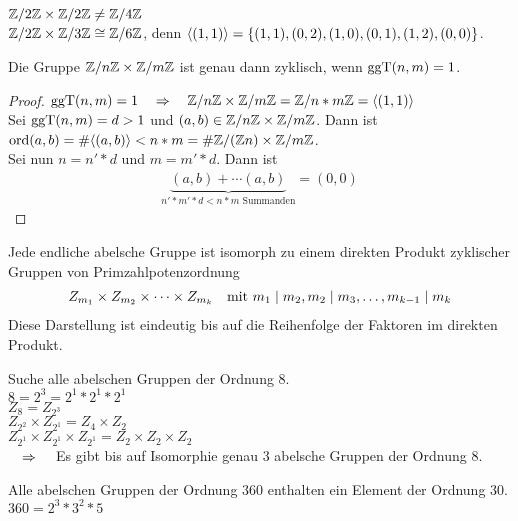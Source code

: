 \begin{bsp}
	$\mathbb{Z} / 2 \mathbb{Z} \times \mathbb{Z} / 2 \mathbb{Z} \neq \mathbb{Z} / 4 \mathbb{Z}$ \\
	$\mathbb{Z} / 2 \mathbb{Z} \times \mathbb{Z} / 3 \mathbb{Z} \cong \mathbb{Z} / 6 \mathbb{Z}$, denn $\langle (1,1) \rangle = \{ (1,1) , (0,2) , (1,0) , (0,1) ,(1,2) , (0,0) \}$.
\end{bsp}

\begin{satz}
	Die Gruppe $\mathbb{Z} / n \mathbb{Z} \times \mathbb{Z} / m \mathbb{Z}$ ist genau dann zyklisch, wenn $\operatorname{ggT}(n,m) = 1$.
\end{satz}
\begin{proof}
	$\operatorname{ggT}(n,m)=1 \quad \Rightarrow \quad \mathbb{Z} / n \mathbb{Z} \times \mathbb{Z} / m \mathbb{Z} = \mathbb{Z} / n*m \mathbb{Z} = \langle (1,1) \rangle$ \\
	Sei $\operatorname{ggT}(n,m) = d > 1$ und $(a,b) \in \mathbb{Z} / n \mathbb{Z} \times \mathbb{Z} / m \mathbb{Z}$. Dann ist $\operatorname{ord}(a,b) = \# \langle (a,b) \rangle < n*m = \# \mathbb{Z} / ( \mathbb{Z} n) \times \mathbb{Z} / m \mathbb{Z}$. \\
	Sei nun $n=n' * d$ und $m=m' * d$. Dann ist
	\begin{align*}
	\underbrace{(a,b) + \cdots (a,b)}_{n'*m'*d < n*m \text{ Summanden}} = (0,0)
	\end{align*}
\end{proof}

\begin{thm}
	Jede endliche abelsche Gruppe ist isomorph zu einem direkten Produkt zyklischer Gruppen von Primzahlpotenzordnung
	\begin{align*}
	Z_{m_1} \times Z_{m_2} \times \cdots \times Z_{m_k} \quad \text{mit } m_1 \mid m_2, m_2 \mid m_3 , \dots , m_{k-1} \mid m_k
	\end{align*}
	Diese Darstellung ist eindeutig bis auf die Reihenfolge der Faktoren im direkten Produkt.
\end{thm}
\begin{bsp}
	Suche alle abelschen Gruppen der Ordnung 8.\\
	$8=2^3=2^1*2^1*2^1$ \\
	$Z_8 = Z_{2^3}$ \\
	$Z_{2^2} \times Z_{2^1} = Z_4 \times Z_2$ \\
	$Z_{2^1} \times Z_{2^1} \times Z_{2^1} = Z_2 \times Z_2 \times Z_2$\\
	$\quad \Rightarrow \quad$ Es gibt bis auf Isomorphie genau 3 abelsche Gruppen der Ordnung 8.
\end{bsp}
\begin{bsp}
	Alle abelschen Gruppen der Ordnung 360 enthalten ein Element der Ordnung 30. \\
	$360 = 2^3 * 3^2 * 5$
\end{bsp}